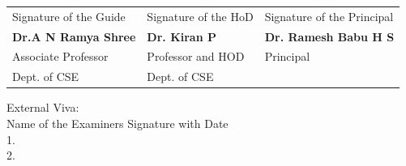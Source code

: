 \vspace{1 cm}
\begin{center}

\begin{table}[ht]
\centering
\begin{tabular}{p{5.5cm} p{5.5cm} p{5.5cm} }
Signature of the Guide & Signature of the HoD & Signature of the Principal \\
\textbf{Dr.A N Ramya Shree} & \textbf{Dr. Kiran P}  & \textbf{Dr. Ramesh Babu H S}\\
Associate Professor & Professor and HOD & Principal \\ 
Dept. of CSE  & Dept. of CSE & \\ 
\end{tabular}

\end{table} 

\end{center}

\vspace{0.5cm}
\begin{flushleft}
External Viva:\\
Name of the Examiners         \hspace{5cm}          Signature with Date  \\
1.  \\
2. \\ 
			
\end{flushleft}
\thispagestyle{empty}





